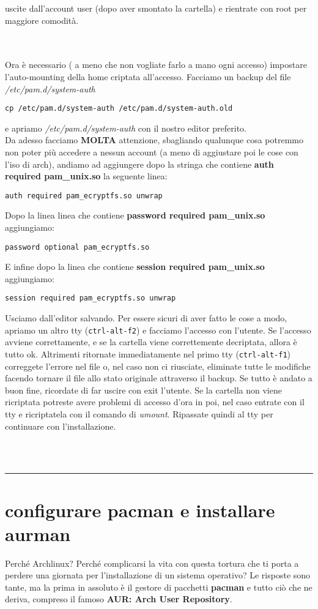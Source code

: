 \documentclass[twoside,italian]{book}
\newcommand{\code}[1]{\texttt{#1}}
\newcommand{\centcode}[1]{

\definecolor{codice}{rgb}{0.5,0.1,0.1}

	\begin{center}
		\color{codice}
		\code{#1}
	\end{center}


}
\newcommand{\nlinea}{
	\leavevmode
	\\
}
\begin{document}
			uscite dall'account user (dopo aver smontato la cartella) e rientrate con root per maggiore comodità.
			\nlinea
			\nlinea
			Ora è necessario ( a meno che non vogliate farlo a mano ogni accesso) impostare l'auto-mounting della home criptata all'accesso.
			Facciamo un backup del file \textit{/etc/pam.d/system-auth} \centcode{cp /etc/pam.d/system-auth /etc/pam.d/system-auth.old}e apriamo \textit{/etc/pam.d/system-auth} con il nostro editor preferito.\\
			Da adesso facciamo \textbf{MOLTA} attenzione, sbagliando qualunque cosa potremmo non poter più accedere a nessun account (a meno di aggiustare poi le cose con l'iso di arch), andiamo ad aggiungere dopo la stringa che contiene \textbf{auth required pam\_unix.so} la seguente linea:
			\centcode{auth    required    pam\_ecryptfs.so unwrap}

			Dopo la linea linea che contiene \textbf{password required pam\_unix.so} aggiungiamo: \centcode{password    optional    pam\_ecryptfs.so}

			E infine dopo la linea che contiene \textbf{session required pam\_unix.so} aggiungiamo:\centcode{session required pam\_ecryptfs.so unwrap}
			Usciamo dall'editor salvando. Per essere sicuri di aver fatto le cose a modo, apriamo un altro tty (\code{ctrl-alt-f2}) e facciamo l'accesso con l'utente. Se l'accesso avviene correttamente, e se la cartella viene correttemente decriptata, allora è tutto ok. Altrimenti ritornate immediatamente nel primo tty (\code{ctrl-alt-f1})  correggete l'errore nel file o, nel caso non ci riusciate, eliminate tutte le modifiche facendo tornare il file allo stato originale attraverso il backup.
			Se tutto è andato a buon fine, ricordate di far uscire con exit l'utente. Se la cartella non viene ricriptata potreste avere problemi di accesso d'ora in poi, nel caso entrate con il tty e ricriptatela con il comando di \textit{umount}.
			Ripassate quindi al tty per continuare con l'installazione.




			\nlinea

			\nlinea

			\hrule


		\section{configurare pacman e installare aurman }

			Perché Archlinux? Perché complicarsi la vita con questa tortura che ti porta a perdere una giornata per l'installazione di un sistema operativo? Le risposte sono tante, ma la prima in assoluto è il gestore di pacchetti \textbf{pacman} e tutto ciò che ne deriva, compreso il famoso \textbf{AUR: Arch User Repository}.
\end{document}
